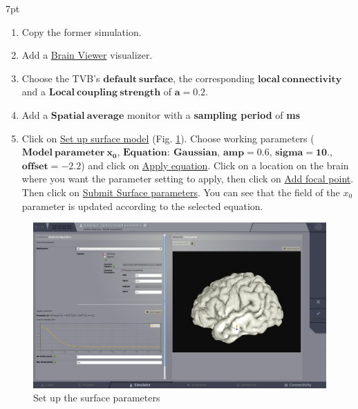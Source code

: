 \documentclass{tufte-handout}
\newenvironment{simulation}{%
  \def\FrameCommand{%
    \hspace{1pt}%
    {\color{ForestGreen}\vrule width 2pt}%
    {\color{simulationshade}\vrule width 4pt}%
    \colorbox{simulationshade}%
  }%
  \MakeFramed{\advance\hsize-\width\FrameRestore}%
  \noindent\hspace{-4.55pt}%
  \begin{adjustwidth}{}{7pt}%
  \vspace{2pt}\vspace{2pt}%
}
{%
  \vspace{2pt}\end{adjustwidth}\endMakeFramed%
}
\begin{document}
  \begin{simulation}
  \begin{enumerate}
  \item Copy the former simulation.
  \item Add a \underline{Brain Viewer} visualizer.
  \item Choose the TVB's $\mathbf{default\:surface}$, the corresponding  $\mathbf{local\:connectivity}$ and a $\mathbf{Local\:coupling\:strength}$ of $\mathbf{a=0.2}$.
  \item Add a $\mathbf{Spatial\:average}$ monitor with a \textbf{sampling period} of \textbf{\unit[1]{ms}}
  \item Click on \underline{Set up surface model} (Fig. \ref{fig:set_up_surface_parameters}). Choose working parameters
  ($\mathbf{Model\:parameter\:x_0}$, $\mathbf{Equation:\:Gaussian}$, $\mathbf{amp=0.6}$, $\mathbf{sigma=10.}$, $\mathbf{offset=-2.2}$) and 
  click on \underline{Apply equation}.
  Click on a location on the brain where you want the parameter setting to apply, then click on \underline{Add focal point}.
  Then click on \underline{Submit Surface parameters}. You can see that the field of the $x_0$ parameter is updated according to the selected equation.
  \end{enumerate}
\end{simulation}

\begin{figure}[h]
  \includegraphics[width=\linewidth]{Handout_UI_ModellingAnEpilepticPatient_SetUpSurfaceParameters}%
  \caption{Set up the surface parameters}%
  \label{fig:set_up_surface_parameters}%
\end{figure}
\end{document}
